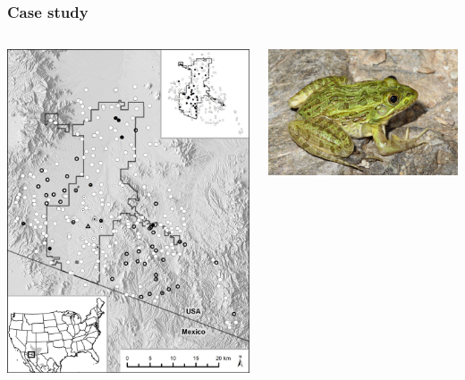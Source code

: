 \documentclass[color=usenames,dvipsnames]{beamer}\usepackage[]{graphicx}\usepackage[]{color}
\begin{document}
\begin{frame}
  \frametitle{Case study}
  \begin{columns}
    \begin{column}{0.5\textwidth}
      \includegraphics[width=\textwidth]{figs/Altar}
    \end{column}
    \begin{column}{0.5\textwidth}
      \includegraphics[width=\textwidth]{figs/lich} \\

\end{column}
\end{columns}
\end{frame}
\end{document}
